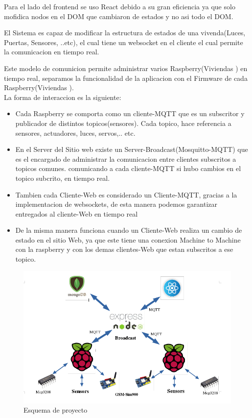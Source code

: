 \documentclass[letterpaper,12pt]{article}
\begin{document}
{		Para el lado del frontend se uso React debido a su gran eficiencia ya que solo mofidica nodos en el DOM que cambiaron de estados y no asi todo el DOM.
		
		El Sistema es capaz de modificar la estructura de estados de una vivenda(Luces, Puertas, Sensores, ..etc), el cual tiene un websocket en el cliente el cual permite la comunicacion en tiempo real.
		
		Este modelo de comunicion permite administrar varios Raspberry(Viviendas ) en tiempo real,  separamos la funcionalidad de la aplicacion con el Firmware de cada Raspberry(Viviendas ).\\
		
		La forma de interaccion  es la siguiente:
		
		\begin{itemize}
			\item Cada Raspberry se comporta como un cliente-MQTT que es un subscritor y publicador de distintos topicos(sensores). Cada topico, hace referencia a sensores, actuadores, luces, servos,.. etc.
			
			\item En el Server del Sitio web existe un Server-Broadcast(Mosquitto-MQTT) que es el encargado de administrar la comunicacion entre clientes subscritos a topicos comunes. comunicando a cada cliente-MQTT si hubo cambios en el topico subcrito, en tiempo real.
			
			\item Tambien cada Cliente-Web es considerado un Cliente-MQTT, gracias a la implementacion de websockets, de esta manera podemos garantizar entregados al cliente-Web en tiempo real
			
			\item De la misma manera funciona cuando un Cliente-Web realiza un cambio de estado en el sitio Web, ya que este tiene una conexion Machine to Machine con la raspberry y con los demas clientes-Web que estan subscritos a ese topico.
		\end{itemize}


		
		
		\begin{figure}[h]
			
			\begin{minipage}[t]{17cm}
				\includegraphics[width=15cm]{images/esquema1.png}	 %
				\caption{ Esquema de proyecto }
			\end{minipage}
			

\end{figure}}
\end{document}
